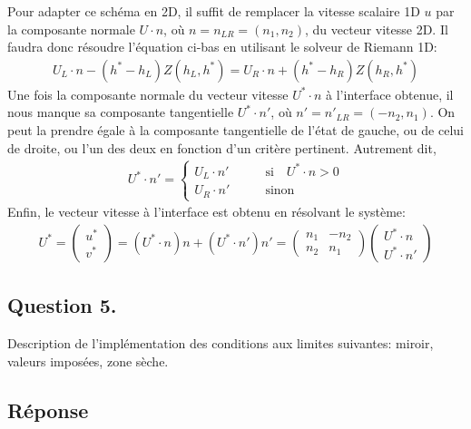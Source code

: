 \documentclass[
	french,
	11pt, %
]{fphw}
\begin{document}
\noindent Pour adapter ce schéma en 2D, il suffit de remplacer la vitesse scalaire 1D $u$ par la composante normale $U \cdot n$, où $n=n_{LR} =(n_1, n_2)$, du vecteur vitesse 2D. Il faudra donc résoudre l'équation ci-bas en utilisant le solveur de Riemann 1D:
\begin{align*}
	U_L \cdot n - (h^* - h_L)Z(h_L, h^*) = U_R \cdot n + (h^* - h_R)Z(h_R, h^*)
\end{align*}
Une fois la composante normale du vecteur vitesse $U^* \cdot n$ à l'interface obtenue, il nous manque sa composante tangentielle $U^* \cdot n'$, où $n'= n'_{LR} = (-n_2, n_1)$. On peut la prendre égale à la composante tangentielle de l'état de gauche, ou de celui de droite, ou l'un des deux en fonction d'un critère pertinent. Autrement dit, 
\begin{align*}
	U^* \cdot n' = 
	\begin{cases}
		U_L \cdot n' &\qquad \text{si} \quad  U^* \cdot n > 0\\
		U_R \cdot n' &\qquad \text{sinon}
	\end{cases}
\end{align*}
Enfin, le vecteur vitesse à l'interface est obtenu en résolvant le système:
\begin{align*}
	U^* = 
	\begin{pmatrix} u^* \\ v^* \end{pmatrix}
	= (U^* \cdot n)n + (U^* \cdot n')n'
	= \begin{pmatrix} n_1 & -n_2 \\ n_2 & n_1 \end{pmatrix}
	\begin{pmatrix} U^* \cdot n \\ U^* \cdot n' \end{pmatrix}
\end{align*}



\subsection*{Question 5.}

\begin{problem}
	Description de l’implémentation des conditions aux limites suivantes: miroir, valeurs imposées, zone sèche.
\end{problem}

\subsection*{Réponse} 
\end{document}
